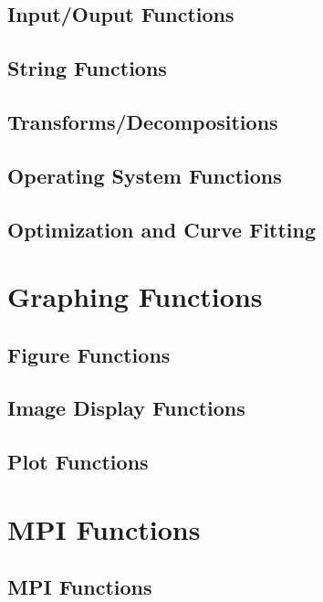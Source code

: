 \documentclass{book}
\begin{document}
\section{Input/Ouput Functions}

\section{String Functions}

\section{Transforms/Decompositions}

\section{Operating System Functions}

\section{Optimization and Curve Fitting}

\chapter{Graphing Functions}
\section{Figure Functions}

\section{Image Display Functions}

\section{Plot Functions}

\chapter{MPI Functions}
\section{MPI Functions}

\end{document}
